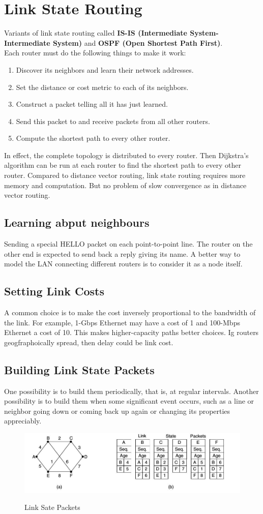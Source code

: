 \documentclass[a4paper,oneside]{book}
\begin{document}
\section{Link State Routing}
Variants of link state routing called \textbf{IS-IS  (Intermediate System-Intermediate System)} and \textbf{OSPF (Open Shortest Path First)}. \\
Each router must do the following things to make it work:
\begin{enumerate}
\item Discover its neighbors and learn their network addresses.
\item Set the distance or cost metric to each of its neighbors.
\item Construct a packet telling all it has just learned.
\item Send this packet to and receive packets from all other routers.
\item Compute the shortest path to every other router.
\end{enumerate}
In effect, the complete topology is distributed to every router. Then Dijkstra’s algorithm can be run at each router to find the shortest path to every other router. Compared to distance vector routing, link state routing requires more memory and computation. But no problem of slow convergence as in distance vector routing.
\subsection{Learning abput neighbours}
Sending a special HELLO packet on each point-to-point line. The router on the other end is expected to send back a reply giving its name.  A better way to model the LAN connecting different routers is to consider it as a node itself.
\subsection{Setting Link Costs}
 A common choice is to make the cost inversely proportional to the bandwidth of the link. For example, 1-Gbps Ethernet may have a cost of 1 and 100-Mbps Ethernet a cost of 10. This makes higher-capacity paths better choices. Ig routers geogfraphoically spread, then delay could be link cost.
\subsection{Building Link State Packets}
One possibility is to build them periodically, that is, at regular intervals. Another possibility is to build them when some significant event occurs, such as a line or neighbor going down or coming back up again or changing its properties appreciably.
\begin{figure}[H]
\caption{Link Sate Packets}
\includegraphics[scale=0.6]{Images/linkStatePkt}
\label{fig:cn_link_st_pkt}
\end{figure}
\end{document}
